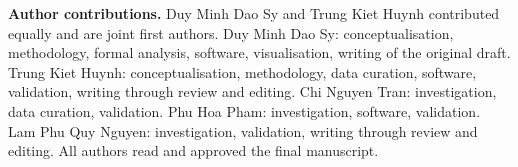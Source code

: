 \documentclass[11pt,a4paper]{article}
\begin{document}
\textbf{Author contributions.} Duy Minh Dao Sy and Trung Kiet Huynh contributed
equally and are joint first authors. Duy Minh Dao Sy: conceptualisation,
methodology, formal analysis, software, visualisation, writing of the original
draft. Trung Kiet Huynh: conceptualisation, methodology, data curation,
software, validation, writing through review and editing. Chi Nguyen Tran:
investigation, data curation, validation. Phu Hoa Pham: investigation, software,
validation. Lam Phu Quy Nguyen: investigation, validation, writing through
review and editing. All authors read and approved the final manuscript.
\end{document}
